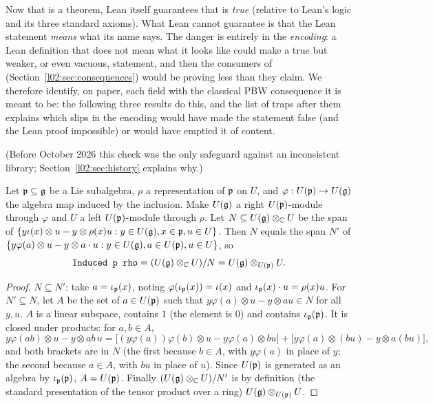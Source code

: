Now that  is a theorem, Lean itself guarantees that  is \emph{true} (relative
to Lean's logic and its three standard axioms). What Lean cannot guarantee is that the Lean statement
\emph{means} what its name says. The danger is entirely in the \emph{encoding}: a Lean definition that
does not mean what it looks like could make  a true but weaker, or even vacuous,
statement, and then the consumers of  (Section~\ref{l02:sec:consequences}) would be proving
less than they claim. We therefore identify, on paper, each field with the classical PBW consequence it
is meant to be: the following three results do this, and the list of traps after them explains which
slips in the encoding would have made the statement false (and the Lean proof impossible) or would have
emptied it of content.

(Before October 2026 this check was the only safeguard against an inconsistent library;
Section~\ref{l02:sec:history} explains why.)

\begin{proposition}\label{l02:prop:induced}
Let $\mathfrak{p}\subseteq\mathfrak{g}$ be a Lie subalgebra, $\rho$ a representation of $\mathfrak{p}$ on $U$, and
$\varphi : U(\mathfrak{p})\to U(\mathfrak{g})$ the algebra map induced by the inclusion. Make $U(\mathfrak{g})$ a right
$U(\mathfrak{p})$-module through $\varphi$ and $U$ a left $U(\mathfrak{p})$-module through $\rho$. Let
$N\subseteq U(\mathfrak{g})\otimes_{\mathbb{C}} U$ be the span of $\{y\iota(x)\otimes u - y\otimes\rho(x)u : y\in U(\mathfrak{g}),
x\in\mathfrak{p},u\in U\}$. Then $N$ equals the span $N'$ of
$\{y\varphi(a)\otimes u - y\otimes a\cdot u : y\in U(\mathfrak{g}), a\in U(\mathfrak{p}), u\in U\}$, so
\begin{equation*}
 \lean{Induced p rho} = (U(\ltwog)\otimes_\C U)/N = U(\ltwog)\otimes_{U(\ltwop)}U.
\end{equation*}
\end{proposition}

\begin{proof}
$N\subseteq N'$: take $a = \iota_{\mathfrak{p}}(x)$, noting $\varphi(\iota_{\mathfrak{p}}(x)) = \iota(x)$ and
$\iota_{\mathfrak{p}}(x)\cdot u = \rho(x)u$. For $N'\subseteq N$, let $A$ be the set of $a\in U(\mathfrak{p})$ such that
$y\varphi(a)\otimes u - y\otimes a u\in N$ for all $y, u$. $A$ is a linear subspace, contains $1$
(the element is $0$) and contains $\iota_{\mathfrak{p}}(\mathfrak{p})$. It is closed under products: for $a,b\in A$,
\begin{equation*}
 y\varphi(ab)\otimes u - y\otimes ab\,u = \bigl[(y\varphi(a))\varphi(b)\otimes u - y\varphi(a)\otimes b u\bigr]
 + \bigl[y\varphi(a)\otimes (bu) - y\otimes a(bu)\bigr],
\end{equation*}
and both brackets are in $N$ (the first because $b\in A$, with $y\varphi(a)$ in place of $y$; the
second because $a\in A$, with $bu$ in place of $u$). Since $U(\mathfrak{p})$ is generated as an algebra by
$\iota_{\mathfrak{p}}(\mathfrak{p})$, $A = U(\mathfrak{p})$. Finally $(U(\mathfrak{g})\otimes_{\mathbb{C}} U)/N'$ is by definition (the
standard presentation of the tensor product over a ring) $U(\mathfrak{g})\otimes_{U(\mathfrak{p})}U$.
\end{proof}

